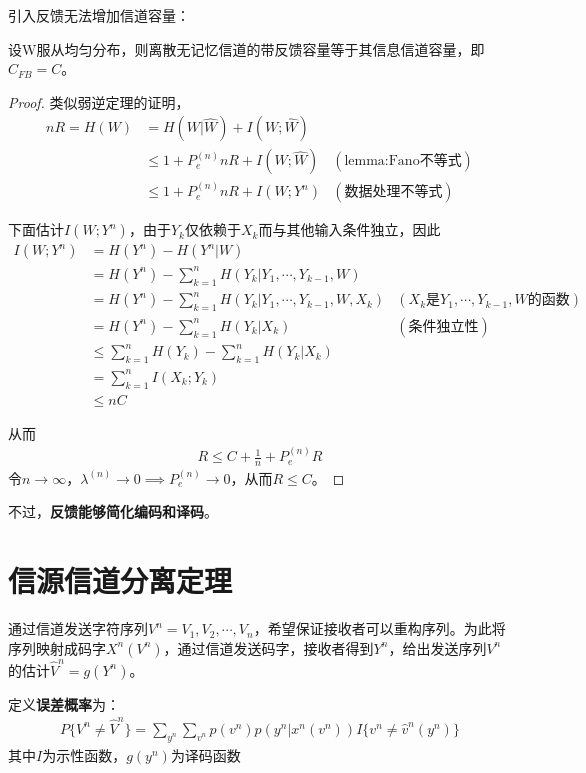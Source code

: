 \documentclass{ctexbook}
\begin{document}
引入反馈无法增加信道容量：
\begin{theorem}[反馈容量]
    设W服从均匀分布，则离散无记忆信道的带反馈容量等于其信息信道容量，即$C_{FB}=C$。
\end{theorem}
\begin{proof}
    类似弱逆定理的证明，\begin{align*}
        nR=H(W)&=H(W|\hat{W})+I(W;\hat{W})\\
        &\leq 1+P_e^{(n)} nR+I(W;\hat{W})&(\text{lemma:Fano不等式})\\
        &\leq 1+P_e^{(n)} nR+I(W;Y^n)&(\text{数据处理不等式})
    \end{align*}    

    下面估计$I(W;Y^n)$，由于$Y_k$仅依赖于$X_k$而与其他输入条件独立，因此\begin{align*}
        I(W;Y^n)&=H(Y^n)-H(Y^n|W)\\
        &=H(Y^n)-\sum_{k=1}^n H(Y_k|Y_1,\cdots,Y_{k-1},W)\\
        &=H(Y^n)-\sum_{k=1}^n H(Y_k|Y_1,\cdots,Y_{k-1},W,X_k)&(X_k\text{是}Y_1,\cdots,Y_{k-1},W\text{的函数})\\
        &=H(Y^n)-\sum_{k=1}^n H(Y_k|X_k)&(\text{条件独立性})\\
        &\leq \sum_{k=1}^n H(Y_k)-\sum_{k=1}^n H(Y_k|X_k)\\
        &=\sum_{k=1}^n I(X_k;Y_k)\\
        &\leq nC
\end{align*}

    从而\begin{align*}
        R\leq C+\frac{1}{n}+P_e^{(n)} R
    \end{align*}
    令$n\to\infty$，$\lambda^{(n)}\to 0\implies P_e^{(n)}\to 0$，从而$R\leq C$。
\end{proof}

不过，\textbf{反馈能够简化编码和译码}。

\section{信源信道分离定理}

通过信道发送字符序列$V^n=V_1,V_2,\cdots,V_n$，希望保证接收者可以重构序列。为此将序列映射成码字$X^n(V^n)$，通过信道发送码字，接收者得到$Y^n$，给出发送序列$V^n$的估计$\hat{V}^n=g(Y^n)$。

\begin{definition}[误差概率]
    定义\textbf{误差概率}为：\begin{align*}
        P\{V^n\neq \hat{V}^n\}=\sum_{y^n}\sum_{v^n}p(v^n)p(y^n|x^n(v^n))I\{v^n\neq \hat{v}^n(y^n)\}
    \end{align*}
    其中$I$为示性函数，$g(y^n)$为译码函数
\end{definition}
\end{document}
